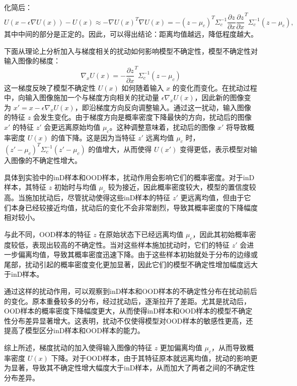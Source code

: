 化简后：
\[
U(x-\epsilon \nabla U(x)) - U(x) \approx
-\nabla U(x)^T \nabla U(x) = -\left( z - \mu_c \right)^T \Sigma_c^{-1} \frac{\partial z}{\partial x} \frac{\partial z}{\partial x}^T \Sigma_c^{-1} \left( z - \mu_c \right),
\]
其中中间的部分是正定的。因此，可以得出结论：距离均值越远，降低程度越大。



下面从理论上分析加入与梯度相关的扰动如何影响模型不确定性，模型不确定性对输入图像的梯度：
\[
\nabla_x U(x) = - \frac{\partial z}{\partial x}^T \Sigma_c^{-1} (z - \mu_c)
\]
这一梯度反映了模型不确定性 \( U(x) \) 如何随着输入 \( x \) 的变化而变化。在扰动过程中，向输入图像施加一个与梯度方向相关的扰动量 \( \epsilon \nabla_x U(x) \)，因此新的图像变为 \( x' = x - \epsilon \nabla_x U(x) \)，即沿梯度方向反向调整输入。通过这一扰动，输入图像的特征 \( z \) 会发生变化。由于梯度方向是概率密度下降最快的方向，扰动后的图像 \( x' \) 的特征 \( z' \) 会更远离原始均值 \( \mu_c \)。这种调整意味着，扰动后的图像 \( x' \) 将导致概率密度 \( U(x) \) 的值下降。这是因为当特征 \( z' \) 远离均值 \( \mu_c \) 时，\( (z' - \mu_c)^T \Sigma_c^{-1} (z' - \mu_c) \) 的值增大，从而使得 \( U(x') \) 变得更低，表示模型对输入图像的不确定性增大。

具体到实验中的inD样本和OOD样本，扰动作用会影响它们的概率密度。对于inD样本，其特征 \( z \) 初始时与均值 \( \mu_c \) 较为接近，因此概率密度较大，模型的置信度较高。当施加扰动后，尽管扰动使得这些inD样本的特征 \( z' \) 更远离均值，但由于它们本身已经较接近均值，扰动后的变化不会非常剧烈，导致其概率密度的下降幅度相对较小。

与此不同，OOD样本的特征 \( z \) 在原始状态下已经远离均值 \( \mu_c \)，因此其初始概率密度较低，表现出较高的不确定性。当对这些样本施加扰动时，它们的特征 \( z' \) 会进一步偏离均值，导致其概率密度迅速下降。由于这些样本初始就处于分布的边缘或尾部，扰动引起的概率密度变化更加显著，因此它们的模型不确定性增加幅度远大于inD样本。

通过这样的扰动作用，可以观察到inD样本和OOD样本的不确定性分布在扰动前后的变化。原本重叠较多的分布，经过扰动后，逐渐拉开了差距。尤其是扰动后，OOD样本的概率密度下降幅度更大，从而使得inD样本和OOD样本的模型不确定性分布差异显著增大。这表明，扰动不仅使得模型对OOD样本的敏感性更高，还提高了模型区分inD样本和OOD样本的能力。

综上所述，梯度扰动的加入使得输入图像的特征 \( z \) 更加偏离均值 \( \mu_c \)，从而导致概率密度 \( U(x) \) 下降。对于OOD样本，由于其特征原本就远离均值，扰动的影响更为显著，导致其不确定性增大幅度大于inD样本，从而加大了两者之间的不确定性分布差异。



